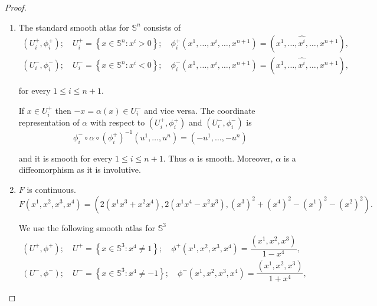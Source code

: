 \begin{proof}
\begin{enumerate}[itemsep=0pt,label={(\alph*)}]
              are smooth so \( p_{n} \) is smooth for every positive integer \( n \), where \( T_{n} \) is the nth Chebyshev polynomial of first kind and \( U_{n} \) is the Chebyshev polynomial of second kind.

              Moreover, \( p_{-n} = p_{n} \circ p_{-1} \) so \( p_{-n} \) is smooth for every positive integer. Thus \( p_{n} \) is smooth for every \( n \in \mathbb{Z} \).
        \item The standard smooth atlas for \( \mathbb{S}^{n} \) consists of
              \[
                  \begin{split}
                      (U_{i}^{+}, \phi_{i}^{+}); \quad U_{i}^{+} = \left\{ x \in \mathbb{S}^{n} : x^{i} > 0 \right\}; \quad \phi_{i}^{+}(x^{1}, \ldots, x^{i}, \ldots, x^{n+1}) = (x^{1}, \ldots, \widehat{x^{i}}, \ldots, x^{n+1}), \\
                      (U_{i}^{-}, \phi_{i}^{-}); \quad U_{i}^{-} = \left\{ x \in \mathbb{S}^{n} : x^{i} < 0 \right\}; \quad \phi_{i}^{-}(x^{1}, \ldots, x^{i}, \ldots, x^{n+1}) = (x^{1}, \ldots, \widehat{x^{i}}, \ldots, x^{n+1}),
                  \end{split}
              \]

              for every \( 1 \le i \le n+1 \).

              If \( x \in U_{i}^{+} \) then \( -x = \alpha(x) \in U_{i}^{-} \) and vice versa. The coordinate representation of \( \alpha \) with respect to \( (U_{i}^{+}, \phi_{i}^{+}) \) and \( (U_{i}^{-}, \phi_{i}^{-}) \) is
              \[
                  \phi_{i}^{-} \circ \alpha \circ {(\phi_{i}^{+})}^{-1}(u^{1}, \ldots, u^{n}) = (-u^{1}, \ldots, -u^{n})
              \]

              and it is smooth for every \( 1 \le i \le n + 1 \). Thus \( \alpha \) is smooth. Moreover, \( \alpha \) is a diffeomorphism as it is involutive.
        \item \( F \) is continuous.
              \[
                  F(x^{1}, x^{2}, x^{3}, x^{4}) = (2(x^{1}x^{3} + x^{2}x^{4}), 2(x^{1}x^{4} - x^{2}x^{3}), {(x^{3})}^{2} + {(x^{4})}^{2} - {(x^{1})}^{2} - {(x^{2})}^{2}).
              \]

              We use the following smooth atlas for \( \mathbb{S}^{3} \)
              \[
                  \begin{split}
                      (U^{+}, \phi^{+}); \quad U^{+} = \left\{ x \in \mathbb{S}^{3} : x^{4} \ne 1 \right\}; \quad \phi^{+}(x^{1}, x^{2}, x^{3}, x^{4}) = \dfrac{(x^{1}, x^{2}, x^{3})}{1 - x^{4}}, \\
                      (U^{-}, \phi^{-}); \quad U^{-} = \left\{ x \in \mathbb{S}^{3} : x^{4} \ne -1 \right\}; \quad \phi^{-}(x^{1}, x^{2}, x^{3}, x^{4}) = \dfrac{(x^{1}, x^{2}, x^{3})}{1 + x^{4}},
                  \end{split}
              \]


\end{enumerate}
\end{proof}
